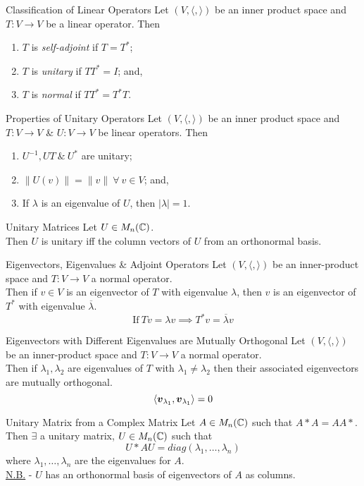 \documentclass[11pt,a4paper]{article}
\begin{document}
\subtitle{Definition 10.08 - }{Classification of Linear Operators}
Let $(V, \langle,\rangle)$ be an inner product space and $T : V \to V$ be a linear operator. Then
\begin{enumerate}[label=\roman*)]
  \item $T$ is \textit{self-adjoint} if $T = T^*$;
  \item $T$ is \textit{unitary} if $TT^* = I$; and,
  \item $T$ is \textit{normal} if $TT^* = T^*T$.
\end{enumerate}

\subtitle{Theorem 10.09 - }{Properties of Unitary Operators}
Let $(V, \langle,\rangle)$ be an inner product space and $T : V \to V$ \& $U : V \to V$ be linear operators. Then
\begin{enumerate}[label=\roman*)]
  \item $U^{-1}, UT\ \&\ U^*$ are unitary;
  \item $\|U(v)\| = \|v\|\ \forall\ v \in V$; and,
  \item If $\lambda$ is an eigenvalue of $U$, then $|\lambda| = 1$.
\end{enumerate}

\subtitle{Theorem 10.10 - }{Unitary Matrices}
Let $U \in M_n(\mathbb{C})$.\\
Then $U$ is unitary iff the column vectors of $U$ from an orthonormal basis.\\

\subtitle{Theorem 10.11 - }{Eigenvectors, Eigenvalues \& Adjoint Operators}
Let $(V, \langle,\rangle)$ be an inner-product space and $T : V \to V$ a normal operator.\\
Then if $v \in V$ is an eigenvector of $T$ with eigenvalue $\lambda$, then $v$ is an eigenvector of $T^*$ with eigenvalue $\overline{\lambda}$.
$$\mathrm{If\ }Tv = \lambda v \implies T^*v = \overline{\lambda}v$$

\subtitle{Theorem 10.12 - }{Eigenvectors with Different Eigenvalues are Mutually Orthogonal}
Let $(V, \langle,\rangle)$ be an inner-product space and $T : V \to V$ a normal operator.\\
Then if $\lambda_1, \lambda_2$ are eigenvalues of $T$ with $\lambda_1 \neq \lambda_2$ then their associated eigenvectors are mutually orthogonal.
$$\langle \boldsymbol{v}_{\lambda_1}, \boldsymbol{v}_{\lambda_1} \rangle = 0$$

\subtitle{Theorem 10.13 - }{Unitary Matrix from a Complex Matrix}
Let $A \in M_n(\mathbb{C})$ such that $A*A = AA*$.\\
Then $\exists$ a unitary matrix, $U \in M_n(\mathbb{C})$ such that
$$U*AU=diag(\lambda_1, \dots , \lambda_n)$$
where $\lambda_1, \dots, \lambda_n$ are the eigenvalues for $A$.\\
\underline{N.B.} - $U$ has an orthonormal basis of eigenvectors of $A$ as columns.\\
\end{document}
